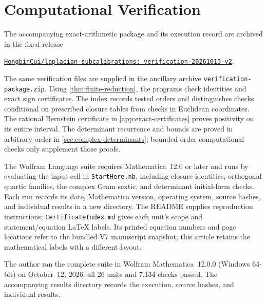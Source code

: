 \section{Computational Verification}
\label{app:computational-verification}

The accompanying exact-arithmetic package and its execution record are archived
in the fixed release
\begin{center}
\href{https://github.com/HongbinCui/laplacian-subcalibrations/releases/tag/verification-20261013-v2}{\texttt{HongbinCui/laplacian-subcalibrations: verification-20261013-v2}}.
\end{center}
The same verification files are supplied in the ancillary archive
\texttt{verification-package.zip}.
Using \cref{thm:finite-reduction}, the programs check identities and
exact sign certificates. The index records tested orders and distinguishes checks conditional on
prescribed closure tables from checks in Euclidean coordinates.
The rational Bernstein certificate in \cref{app:exact-certificates}
proves positivity on its entire interval. The determinant recurrence
and bounds are proved in arbitrary order in
\cref{sec:complex-determinants}; bounded-order computational checks
only supplement those proofs.

The Wolfram Language suite requires Mathematica~12.0 or later and runs
by evaluating the input cell in \texttt{StartHere.nb}, including closure
identities, orthogonal quartic families, the complex Gram sextic, and
determinant initial-form checks. Each run records its date, Mathematica
version, operating system, source hashes, and individual results in a
new directory. The README supplies reproduction instructions;
\texttt{CertificateIndex.md} gives each unit's scope and statement/equation
LaTeX labels. Its printed equation numbers and page locations refer to
the bundled V7 manuscript snapshot; this article retains the
mathematical labels with a different layout.

The author ran the complete suite in Wolfram Mathematica~12.0.0
(Windows 64-bit) on October~12, 2026: all 26 units and 7,134 checks
passed. The accompanying results directory records the execution,
source hashes, and individual results.
